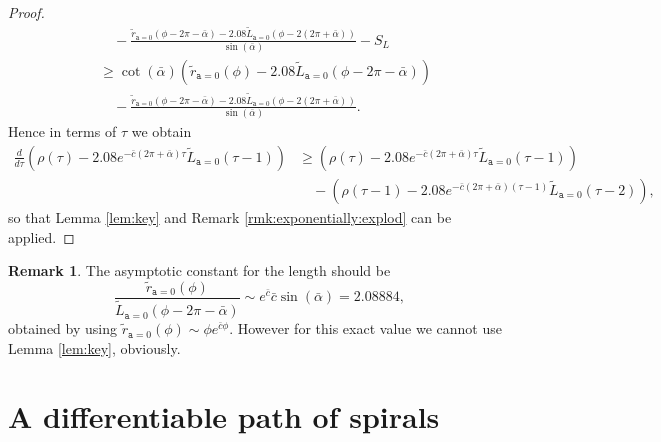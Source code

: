 \documentclass[reqno]{amsart}
\theoremstyle{definition} \newtheorem{definition}{Definition}[section]
\theoremstyle{definition} \newtheorem{remark}[definition]{Remark}
\theoremstyle{plain} \newtheorem{lemma}[definition]{Lemma}
\theoremstyle{plain} \newtheorem{proposition}[definition]{Proposition}
\theoremstyle{plain} \newtheorem{theorem}[definition]{Theorem}
\theoremstyle{plain} \newtheorem{corollary}[definition]{Corollary}
\theoremstyle{definition} \newtheorem{example}[definition]{Example}
\theoremstyle{plain} \newtheorem{claim}[clai]{Claim}
\theoremstyle{definition} \newtheorem{assumption}[definition]{Assumption}
\theoremstyle{definition} \newtheorem{observation}[definition]{Observation}
\newcommand{\1}{\mathbbm 1}
\numberwithin{equation}{section} %
\theoremstyle{plain} \newtheorem*{theorem*}{Theorem}
\theoremstyle{plain} \newtheorem{mthm}[maintheorem]{Main Theorem}
\theoremstyle{plain} \newtheorem*{mthm*}{Main Theorem}
\theoremstyle{plain} \newtheorem*{conjecture*}{Conjecture}
\theoremstyle{plain} \newtheorem{conjecture}[definition]{Conjecture}
\theoremstyle{plain} \newtheorem*{problem*}{Problem}
\begin{document}
\begin{proof}
\begin{align*}
& \quad - \frac{\tilde r_{\mathtt a = 0}(\phi - 2\pi - \bar \alpha) - 2.08 \tilde L_{\mathtt a = 0}(\phi - 2(2\pi + \bar \alpha))}{\sin(\bar \alpha)} - S_L \\
&\geq \cot(\bar \alpha) (\tilde r_{\mathtt a = 0}(\phi) - 2.08 \tilde L_{\mathtt a = 0}(\phi - 2\pi - \bar \alpha)) \\
& \quad - \frac{\tilde r_{\mathtt a = 0}(\phi - 2\pi - \bar \alpha) - 2.08 \tilde L_{\mathtt a = 0}(\phi - 2(2\pi + \bar \alpha))}{\sin(\bar \alpha)}.
\end{align*}
Hence in terms of $\tau$ we obtain
\begin{equation*}
\begin{split}
\frac{d}{d\tau} (\rho(\tau) - 2.08 e^{-\bar c(2\pi + \bar \alpha) \tau} \tilde L_{\mathtt a = 0}(\tau-1)) &\geq (\rho(\tau) - 2.08 e^{-\bar c(2\pi + \bar \alpha) \tau} \tilde L_{\mathtt a = 0}(\tau-1)) \\
& \quad - (\rho(\tau-1) - 2.08 e^{-\bar c(2\pi + \bar \alpha) (\tau-1)} \tilde L_{\mathtt a = 0}(\tau-2)),
\end{split}
\end{equation*}
so that Lemma \ref{lem:key} and Remark \ref{rmk:exponentially:explod} can be applied.
\end{proof}

\begin{remark}
\label{Rem:asymtp_consta_for_comp}
The asymptotic constant for the length should be
\begin{equation}
\label{Equa:exact_Lbaserho}
\frac{\tilde r_{\mathtt a = 0}(\phi)}{\tilde L_{\mathtt a = 0}(\phi-2\pi-\bar \alpha)} \sim e^{\bar c} \bar c \sin(\bar \alpha) = 2.08884,
\end{equation}
obtained by using $\tilde r_{\mathtt a = 0}(\phi) \sim \phi e^{\bar c \phi}$. However for this exact value we cannot use Lemma \ref{lem:key}, obviously.
\end{remark}


\section{A differentiable path of spirals}
\label{S:family}
\end{document}
